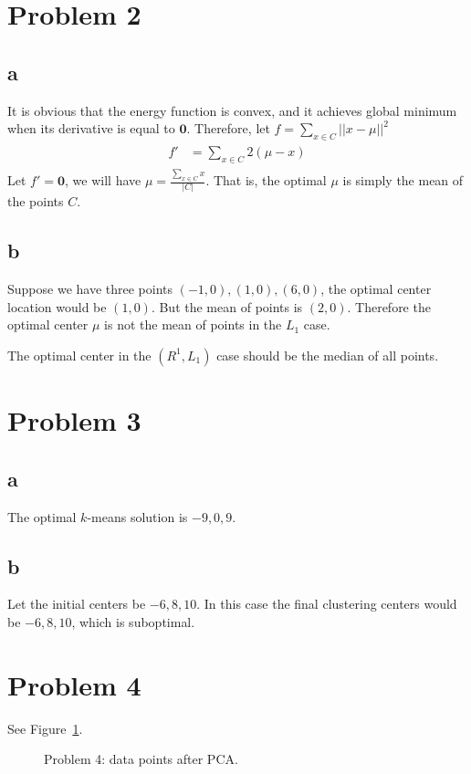 \documentclass[a4paper,11pt]{article}
\theoremstyle{mytheor}
\begin{document}
\section*{Problem 2}
\subsection*{a}
It is obvious that the energy function is convex, and it achieves global minimum when its derivative is equal to $\mathbf{0}$. Therefore, let $f = \sum\limits_{x\in C}|| x - \mu||^2$
\begin{align}
    \begin{split}
        f' &= \sum\limits_{x \in C} 2 (\mu - x)
    \end{split}
\end{align}
Let $f' = \mathbf{0}$, we will have $\mu = \frac{\sum\limits_{x \in C} x} {|C|}$.
That is, the optimal $\mu$ is simply the mean of the points $C$.

\subsection*{b}
Suppose we have three points $(-1, 0), (1, 0), (6, 0)$, the optimal center location would be $(1,0)$. But the mean of
points is $(2, 0)$. Therefore the optimal center $\mu$ is not the mean of points in the $L_1$ case.

The optimal center in the $(R^1, L_1)$ case should be the median of all points.

\section*{Problem 3}
\subsection*{a}
The optimal $k$-means solution is $-9, 0, 9$.

\subsection*{b}
Let the initial centers be $-6, 8 , 10$. In this case the final clustering
centers would be $-6, 8, 10$, which is suboptimal.

\section*{Problem 4}
See Figure~\ref{fig:4}.
\begin{figure}
    \caption{Problem 4: data points after PCA.}
    \label{fig:4}
\end{figure}
\end{document}
